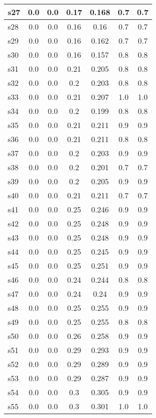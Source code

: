 \documentclass{article}
\begin{document}
\begin{tabular}{|l|c|c|c|c|c|c|}
s27 &0.0 & 0.0 & 0.17 & 0.168 & 0.7 & 0.7\\
\hline
s28 &0.0 & 0.0 & 0.16 & 0.16 & 0.7 & 0.7\\
\hline
s29 &0.0 & 0.0 & 0.16 & 0.162 & 0.7 & 0.7\\
\hline
s30 &0.0 & 0.0 & 0.16 & 0.157 & 0.8 & 0.8\\
\hline
s31 &0.0 & 0.0 & 0.21 & 0.205 & 0.8 & 0.8\\
\hline
s32 &0.0 & 0.0 & 0.2 & 0.203 & 0.8 & 0.8\\
\hline
s33 &0.0 & 0.0 & 0.21 & 0.207 & 1.0 & 1.0\\
\hline
s34 &0.0 & 0.0 & 0.2 & 0.199 & 0.8 & 0.8\\
\hline
s35 &0.0 & 0.0 & 0.21 & 0.211 & 0.9 & 0.9\\
\hline
s36 &0.0 & 0.0 & 0.21 & 0.211 & 0.8 & 0.8\\
\hline
s37 &0.0 & 0.0 & 0.2 & 0.203 & 0.9 & 0.9\\
\hline
s38 &0.0 & 0.0 & 0.2 & 0.201 & 0.7 & 0.7\\
\hline
s39 &0.0 & 0.0 & 0.2 & 0.205 & 0.9 & 0.9\\
\hline
s40 &0.0 & 0.0 & 0.21 & 0.211 & 0.7 & 0.7\\
\hline
s41 &0.0 & 0.0 & 0.25 & 0.246 & 0.9 & 0.9\\
\hline
s42 &0.0 & 0.0 & 0.25 & 0.248 & 0.9 & 0.9\\
\hline
s43 &0.0 & 0.0 & 0.25 & 0.248 & 0.9 & 0.9\\
\hline
s44 &0.0 & 0.0 & 0.25 & 0.245 & 0.9 & 0.9\\
\hline
s45 &0.0 & 0.0 & 0.25 & 0.251 & 0.9 & 0.9\\
\hline
s46 &0.0 & 0.0 & 0.24 & 0.244 & 0.8 & 0.8\\
\hline
s47 &0.0 & 0.0 & 0.24 & 0.24 & 0.9 & 0.9\\
\hline
s48 &0.0 & 0.0 & 0.25 & 0.255 & 0.9 & 0.9\\
\hline
s49 &0.0 & 0.0 & 0.25 & 0.255 & 0.8 & 0.8\\
\hline
s50 &0.0 & 0.0 & 0.26 & 0.258 & 0.9 & 0.9\\
\hline
s51 &0.0 & 0.0 & 0.29 & 0.293 & 0.9 & 0.9\\
\hline
s52 &0.0 & 0.0 & 0.29 & 0.289 & 0.9 & 0.9\\
\hline
s53 &0.0 & 0.0 & 0.29 & 0.287 & 0.9 & 0.9\\
\hline
s54 &0.0 & 0.0 & 0.3 & 0.305 & 0.9 & 0.9\\
\hline
s55 &0.0 & 0.0 & 0.3 & 0.301 & 1.0 & 1.0\\

\end{tabular}
\end{document}
